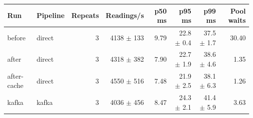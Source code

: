 \begin{tabular}{llrrrrrr}
\toprule
Run & Pipeline & Repeats & Readings/s & p50 ms & p95 ms & p99 ms & Pool waits \\
\midrule
before & direct & 3 & 4138 $\pm$ 133 & 9.79 & 22.8 $\pm$ 0.4 & 37.5 $\pm$ 1.7 & 30.40 \\
after & direct & 3 & 4318 $\pm$ 382 & 7.90 & 22.7 $\pm$ 1.9 & 38.6 $\pm$ 4.6 & 1.35 \\
after-cache & direct & 3 & 4550 $\pm$ 516 & 7.48 & 21.9 $\pm$ 2.5 & 38.1 $\pm$ 6.3 & 1.26 \\
kafka & kafka & 3 & 4036 $\pm$ 456 & 8.47 & 24.3 $\pm$ 2.1 & 41.4 $\pm$ 5.9 & 3.63 \\
\bottomrule
\end{tabular}
